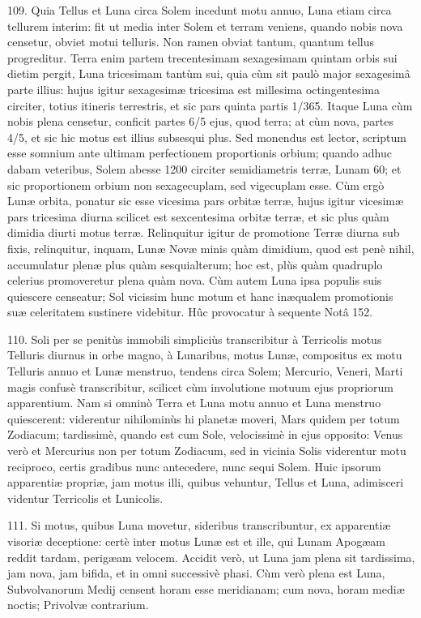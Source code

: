 \documentclass[a4paper, 11pt, oneside, polutonikogreek, german]{article}
\begin{document}
109. Quia Tellus et Luna circa Solem incedunt motu annuo, Luna etiam circa tellurem interim: fit ut media inter Solem et terram veniens, quando nobis nova censetur, obviet motui telluris. Non ramen obviat tantum, quantum tellus progreditur. Terra enim partem trecentesimam sexagesimam quintam orbis sui dietim pergit, Luna tricesimam tantùm sui, quia cùm sit paulò major sexagesimâ parte illius: hujus igitur sexagesimæ tricesima est millesima octingentesima circiter, totius itineris terrestris, et sic pars quinta partis 1/365. Itaque Luna cùm nobis plena censetur, conficit partes 6/5 ejus, quod terra; at cùm nova, partes 4/5, et sic hic motus est illius subsesqui plus. Sed monendus est lector, scriptum esse somnium ante ultimam perfectionem proportionis orbium; quando adhuc dabam veteribus, Solem abesse 1200 circiter semidiametris terræ, Lunam 60; et sic proportionem orbium non sexagecuplam, sed vigecuplam esse. Cùm ergò Lunæ orbita, ponatur sic esse vicesima pars orbitæ terræ, hujus igitur vicesimæ pars tricesima diurna scilicet est sexcentesima orbitæ terræ, et sic plus quàm dimidia diurti motus terræ. Relinquitur igitur de promotione Terræ diurna sub fixis, relinquitur, inquam, Lunæ Novæ minis quàm dimidium, quod est penè nihil, accumulatur plenæ plus quàm sesquialterum; hoc est, plùs quàm quadruplo celerius promoveretur plena quàm nova. Cùm autem Luna ipsa populis suis quiescere censeatur; Sol vicissim hunc motum et hanc inæqualem promotionis suæ celeritatem sustinere videbitur. Hûc provocatur à sequente Notâ 152.

110. Soli per se penitùs immobili simpliciùs transcribitur à Terricolis motus Telluris diurnus in orbe magno, à Lunaribus, motus Lunæ, compositus ex motu Telluris annuo et Lunæ menstruo, tendens circa Solem; Mercurio, Veneri, Marti magis confusè transcribitur, scilicet cùm involutione motuum ejus propriorum apparentium. Nam si omninò Terra et Luna motu annuo et Luna menstruo quiescerent: viderentur nihilominùs hi planetæ moveri, Mars quidem per totum Zodiacum; tardissimè, quando est cum Sole, velocissimè in ejus opposito: Venus verò et Mercurius non per totum Zodiacum, sed in vicinia Solis viderentur motu reciproco, certis gradibus nunc antecedere, nunc sequi Solem. Huic ipsorum apparentiæ propriæ, jam motus illi, quibus vehuntur, Tellus et Luna, adimisceri videntur Terricolis et Lunicolis.

111. Si motus, quibus Luna movetur, sideribus transcribuntur, ex apparentiæ visoriæ deceptione: certè inter motus Lunæ est et ille, qui Lunam Apogæam reddit tardam, perigæam velocem. Accidit verò, ut Luna jam plena sit tardissima, jam nova, jam bifida, et in omni successivè phasi. Cùm verò plena est Luna, Subvolvanorum Medij censent horam esse meridianam; cum nova, horam mediæ noctis; Privolvæ contrarium.
\end{document}
